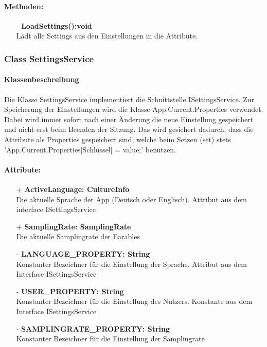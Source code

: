 \documentclass[a4paper,12pt]{article}
\begin{document}
	\paragraph{Methoden:}
	\begin{itemize}
		\item[-] \textbf{LoadSettings():void}\\Lädt alle Settings aus den Einstellungen in die Attribute.	
	\end{itemize}
\subsubsection{Class SettingsService}
	\paragraph{Klassenbeschreibung}
	Die Klasse SettingsService implementiert die Schnittstelle ISettingsService. Zur Speicherung der Einstellungen wird die Klasse App.Current.Properties verwendet.
	Dabei wird immer sofort nach einer Änderung die neue Einstellung gespeichert und nicht erst beim Beenden der Sitzung.
	Das wird gesichert dadurch, dass die Attribute als Properties gespeichert sind, welche beim Setzen (set) stets 'App.Current.Properties[Schlüssel] = value;' benutzen.
	\paragraph{Attribute:}
	\begin{itemize}
		\item[+] \textbf{ActiveLanguage: CultureInfo}\\Die aktuelle Sprache der App (Deutsch oder Englisch). Attribut aus dem interface ISettingsService\\
		\item[+] \textbf{SamplingRate: SamplingRate}\\Die aktuelle Samplingrate der \Gls{Earables} \\ 
		\item[-] \textbf{LANGUAGE\_PROPERTY: String}\\Konstanter Bezeichner für die Einstellung der Sprache. Attribut aus dem Interface ISettingsService \\
		\item[-] \textbf{USER\_PROPERTY: String}\\Konstanter Bezeichner für die Einstellung des Nutzers. Konstante aus dem Interface ISettingsService \\
		\item[-] \textbf{SAMPLINGRATE\_PROPERTY: String}\\Konstanter Bezeichner für die Einstellung der Samplingrate \\
	\end{itemize}
\end{document}
